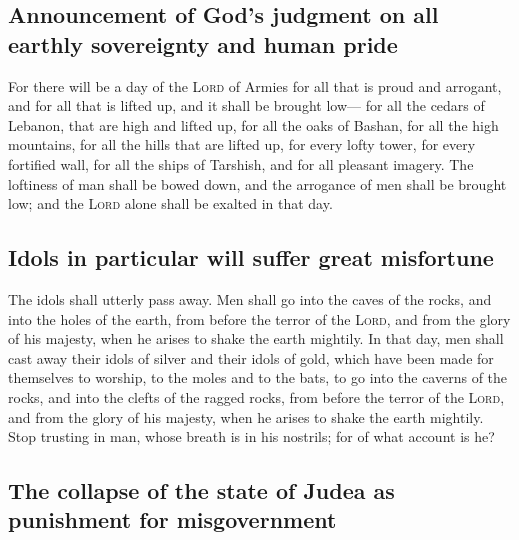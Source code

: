 \hypertarget{announcement-of-gods-judgment-on-all-earthly-sovereignty-and-human-pride}{%
\subsection{Announcement of God's judgment on all earthly sovereignty
and human
pride}\label{announcement-of-gods-judgment-on-all-earthly-sovereignty-and-human-pride}}

 For there will be a day of the \textsc{Lord} of Armies
for all that is proud and arrogant, and for all that is lifted up, and
it shall be brought low---  for all the cedars of
Lebanon, that are high and lifted up, for all the oaks of Bashan,
 for all the high mountains, for all the hills that are
lifted up,  for every lofty tower, for every fortified
wall,  for all the ships of Tarshish, and for all
pleasant imagery.  The loftiness of man shall be bowed
down, and the arrogance of men shall be brought low; and the
\textsc{Lord} alone shall be exalted in that day.

\hypertarget{idols-in-particular-will-suffer-great-misfortune}{%
\subsection{Idols in particular will suffer great
misfortune}\label{idols-in-particular-will-suffer-great-misfortune}}

 The idols shall utterly pass away.  Men
shall go into the caves of the rocks, and into the holes of the earth,
from before the terror of the \textsc{Lord}, and from the glory of his
majesty, when he arises to shake the earth mightily.  In
that day, men shall cast away their idols of silver and their idols of
gold, which have been made for themselves to worship, to the moles and
to the bats,  to go into the caverns of the rocks, and
into the clefts of the ragged rocks, from before the terror of the
\textsc{Lord}, and from the glory of his majesty, when he arises to
shake the earth mightily.  Stop trusting in man, whose
breath is in his nostrils; for of what account is he?

\hypertarget{the-collapse-of-the-state-of-judea-as-punishment-for-misgovernment}{%
\subsection{The collapse of the state of Judea as punishment for
misgovernment}\label{the-collapse-of-the-state-of-judea-as-punishment-for-misgovernment}}

